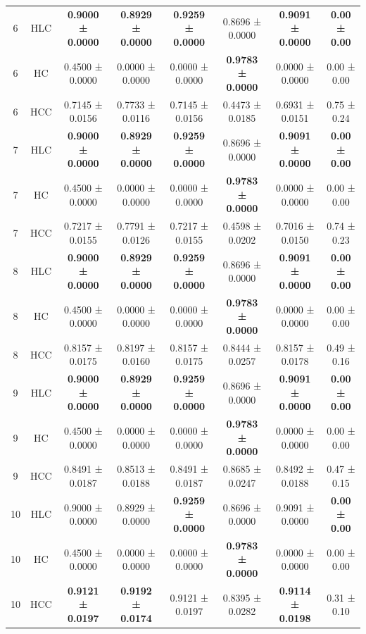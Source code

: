 \begin{table}[!ht]
{\begin{tabular}{|c|c|c|c|c|c|c|c|}
\hline
6 & HLC & \textbf{0.9000 ± 0.0000} & \textbf{0.8929 ± 0.0000} & \textbf{0.9259 ± 0.0000} & 0.8696 ± 0.0000 & \textbf{0.9091 ± 0.0000} & \textbf{0.00 ± 0.00} \\
6 & HC & 0.4500 ± 0.0000 & 0.0000 ± 0.0000 & 0.0000 ± 0.0000 & \textbf{0.9783 ± 0.0000} & 0.0000 ± 0.0000 & 0.00 ± 0.00 \\
6 & HCC & 0.7145 ± 0.0156 & 0.7733 ± 0.0116 & 0.7145 ± 0.0156 & 0.4473 ± 0.0185 & 0.6931 ± 0.0151 & 0.75 ± 0.24 \\
\hline
7 & HLC & \textbf{0.9000 ± 0.0000} & \textbf{0.8929 ± 0.0000} & \textbf{0.9259 ± 0.0000} & 0.8696 ± 0.0000 & \textbf{0.9091 ± 0.0000} & \textbf{0.00 ± 0.00} \\
7 & HC & 0.4500 ± 0.0000 & 0.0000 ± 0.0000 & 0.0000 ± 0.0000 & \textbf{0.9783 ± 0.0000} & 0.0000 ± 0.0000 & 0.00 ± 0.00 \\
7 & HCC & 0.7217 ± 0.0155 & 0.7791 ± 0.0126 & 0.7217 ± 0.0155 & 0.4598 ± 0.0202 & 0.7016 ± 0.0150 & 0.74 ± 0.23 \\
\hline
8 & HLC & \textbf{0.9000 ± 0.0000} & \textbf{0.8929 ± 0.0000} & \textbf{0.9259 ± 0.0000} & 0.8696 ± 0.0000 & \textbf{0.9091 ± 0.0000} & \textbf{0.00 ± 0.00} \\
8 & HC & 0.4500 ± 0.0000 & 0.0000 ± 0.0000 & 0.0000 ± 0.0000 & \textbf{0.9783 ± 0.0000} & 0.0000 ± 0.0000 & 0.00 ± 0.00 \\
8 & HCC & 0.8157 ± 0.0175 & 0.8197 ± 0.0160 & 0.8157 ± 0.0175 & 0.8444 ± 0.0257 & 0.8157 ± 0.0178 & 0.49 ± 0.16 \\
\hline
9 & HLC & \textbf{0.9000 ± 0.0000} & \textbf{0.8929 ± 0.0000} & \textbf{0.9259 ± 0.0000} & 0.8696 ± 0.0000 & \textbf{0.9091 ± 0.0000} & \textbf{0.00 ± 0.00} \\
9 & HC & 0.4500 ± 0.0000 & 0.0000 ± 0.0000 & 0.0000 ± 0.0000 & \textbf{0.9783 ± 0.0000} & 0.0000 ± 0.0000 & 0.00 ± 0.00 \\
9 & HCC & 0.8491 ± 0.0187 & 0.8513 ± 0.0188 & 0.8491 ± 0.0187 & 0.8685 ± 0.0247 & 0.8492 ± 0.0188 & 0.47 ± 0.15 \\
\hline
10 & HLC & 0.9000 ± 0.0000 & 0.8929 ± 0.0000 & \textbf{0.9259 ± 0.0000} & 0.8696 ± 0.0000 & 0.9091 ± 0.0000 & \textbf{0.00 ± 0.00} \\
10 & HC & 0.4500 ± 0.0000 & 0.0000 ± 0.0000 & 0.0000 ± 0.0000 & \textbf{0.9783 ± 0.0000} & 0.0000 ± 0.0000 & 0.00 ± 0.00 \\
10 & HCC & \textbf{0.9121 ± 0.0197} & \textbf{0.9192 ± 0.0174} & 0.9121 ± 0.0197 & 0.8395 ± 0.0282 & \textbf{0.9114 ± 0.0198} & 0.31 ± 0.10 \\
\hline
\end{tabular}
}%
\end{table}


